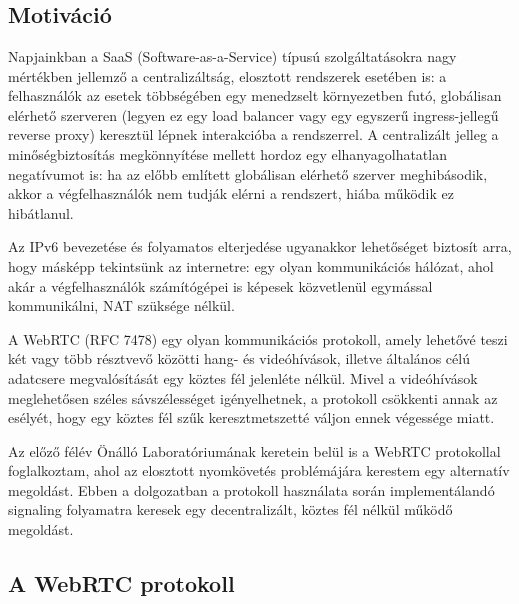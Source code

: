 \chapter{\bevezetes}\label{ch:bevezetes}


\section{Motiváció}\label{sec:motiváció}

Napjainkban a SaaS (Software-as-a-Service) típusú szolgáltatásokra nagy mértékben jellemző a centralizáltság, elosztott
rendszerek esetében is: a felhasználók az esetek többségében egy menedzselt környezetben futó, globálisan
elérhető szerveren (legyen ez egy load balancer vagy egy egyszerű ingress-jellegű reverse proxy) keresztül lépnek
interakcióba a rendszerrel.
A centralizált jelleg a minőségbiztosítás megkönnyítése mellett hordoz egy elhanyagolhatatlan negatívumot is: ha az előbb
említett globálisan elérhető szerver meghibásodik, akkor a végfelhasználók nem tudják elérni a rendszert, hiába működik
ez hibátlanul.

Az IPv6 bevezetése és folyamatos elterjedése ugyanakkor lehetőséget biztosít arra, hogy másképp tekintsünk az internetre:
egy olyan kommunikációs hálózat, ahol akár a végfelhasználók számítógépei is képesek közvetlenül egymással kommunikálni,
NAT szüksége nélkül.

A WebRTC (RFC 7478\cite{RFC_7478}) egy olyan kommunikációs protokoll, amely lehetővé teszi két vagy több résztvevő közötti hang- és
videóhívások, illetve általános célú adatcsere megvalósítását egy köztes fél jelenléte nélkül.
Mivel a videóhívások meglehetősen széles sávszélességet igényelhetnek, a protokoll csökkenti annak az esélyét,
hogy egy köztes fél szűk keresztmetszetté váljon ennek végessége miatt.

Az előző félév Önálló Laboratóriumának keretein belül is a WebRTC protokollal foglalkoztam, ahol az elosztott nyomkövetés
problémájára kerestem egy alternatív megoldást.
Ebben a dolgozatban a protokoll használata során implementálandó signaling folyamatra keresek egy decentralizált, köztes
fél nélkül működő megoldást.


\section{A WebRTC protokoll}\label{sec:a-webrtc-protokoll}

